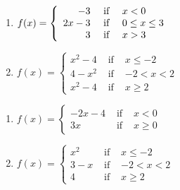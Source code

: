 \begin{multicols}{2}
\begin{enumerate}
\setcounter{enumi}{\value{HW}}

\item ${\displaystyle f(x) = \left\{ \begin{array}{rcl}  -3 & \mbox{ if } & x < 0 \\
                                                        2x-3 & \mbox{ if } & \scriptsize 0 \leq x \leq 3 \\
                                                            3 & \mbox{ if } & x > 3  
                                     \end{array} \right. }$

\item ${\displaystyle f(x) = \left\{ \begin{array}{rcl} x^2 - 4 & \mbox{ if } &x \leq -2\\
                                                                  4-x^2 & \mbox{ if } & -2 < x < 2 \\
                                                         x^2-4 & \mbox{ if } & x \geq 2 
                                     \end{array} \right. }$


\setcounter{HW}{\value{enumi}}
\end{enumerate}
\end{multicols}

\newpage

\begin{multicols}{2}
\begin{enumerate}
\setcounter{enumi}{\value{HW}}

\item ${\displaystyle f(x) = \left\{ \begin{array}{rcl} -2x - 4 & \mbox{ if } &  x < 0 \\
                                                             3x & \mbox{ if } & x \geq 0 
                                     \end{array} \right. }$

\item ${\displaystyle f(x) = \left\{ \begin{array}{rcl} x^{2} & \mbox{ if } & x \leq -2 \\
                                                        3 - x & \mbox{ if } & -2 < x < 2 \\
                                                            4 & \mbox{ if } & x \geq 2  
                                     \end{array} \right. }$

\setcounter{HW}{\value{enumi}}
\end{enumerate}
\end{multicols}

